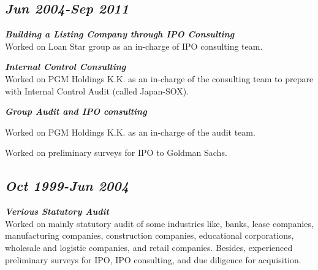 \subsection*{\normalsize \itshape \bfseries Jun 2004-Sep 2011}
{\bfseries \itshape Building a Listing Company through IPO Consulting} \\
Worked on Loan Star group as an in-charge of IPO consulting team.

{\bfseries \itshape Internal Control Consulting} \\
Worked on PGM Holdings K.K. as an in-charge of the consulting team to prepare with Internal Control Audit (called Japan-SOX).

{\bfseries \itshape Group Audit and IPO consulting}
\begin{itemize}
\begin{spacing}{0.6}
  \item Worked on PGM Holdings K.K. as an in-charge of the audit team.
  \item Worked on preliminary surveys for IPO to Goldman Sachs. 
\end{spacing}
\end{itemize}

\subsection*{\normalsize \itshape \bfseries Oct 1999-Jun 2004}
{\bfseries \itshape Verious Statutory Audit} \\
Worked on mainly statutory audit of some industries like, banks, lease companies, manufacturing companies, construction companies, educational corporations, wholesale and logistic companies, and retail companies. Besides, experienced preliminary surveys for IPO, IPO consulting, and due diligence for acquisition.




